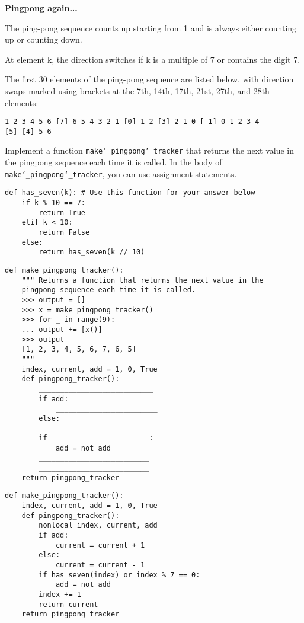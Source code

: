 \begin{blocksection}
\question \textbf{Pingpong again...}\\
\begin{nonsol}
The ping-pong sequence counts up starting from 1 and is
always either counting up or counting down.

At element k, the direction switches if k is a multiple of 7 or contains the
digit 7.

The first 30 elements of the ping-pong sequence are listed below, with direction
swaps marked using brackets at the 7th, 14th, 17th, 21st, 27th, and 28th
elements:
\begin{lstlisting}
1 2 3 4 5 6 [7] 6 5 4 3 2 1 [0] 1 2 [3] 2 1 0 [-1] 0 1 2 3 4
[5] [4] 5 6
\end{lstlisting}
\end{nonsol}

Implement a function \texttt{make\char`_pingpong\char`_tracker} that returns the
next value in the pingpong sequence each time it is called. In the body of
\texttt{make\char`_pingpong\char`_tracker}, you can use assignment statements.
\newline

\begin{lstlisting}
def has_seven(k): # Use this function for your answer below
    if k % 10 == 7:
        return True
    elif k < 10:
        return False
    else:
        return has_seven(k // 10)
\end{lstlisting}

\begin{nonsol}
\begin{lstlisting}
def make_pingpong_tracker():
    """ Returns a function that returns the next value in the
    pingpong sequence each time it is called.
    >>> output = []
    >>> x = make_pingpong_tracker()
    >>> for _ in range(9):
    ... output += [x()]
    >>> output
    [1, 2, 3, 4, 5, 6, 7, 6, 5]
    """
    index, current, add = 1, 0, True
    def pingpong_tracker():
        ___________________________
        if add:
            ________________________
        else:
            ________________________
        if _______________________:
            add = not add
        __________________________
        __________________________
    return pingpong_tracker

\end{lstlisting}
\end{nonsol}

\begin{solution}
\begin{lstlisting}
def make_pingpong_tracker():
    index, current, add = 1, 0, True
    def pingpong_tracker():
        nonlocal index, current, add
        if add:
            current = current + 1
        else:
            current = current - 1
        if has_seven(index) or index % 7 == 0:
            add = not add
        index += 1
        return current
    return pingpong_tracker
\end{lstlisting}
\end{solution}

\end{blocksection}


